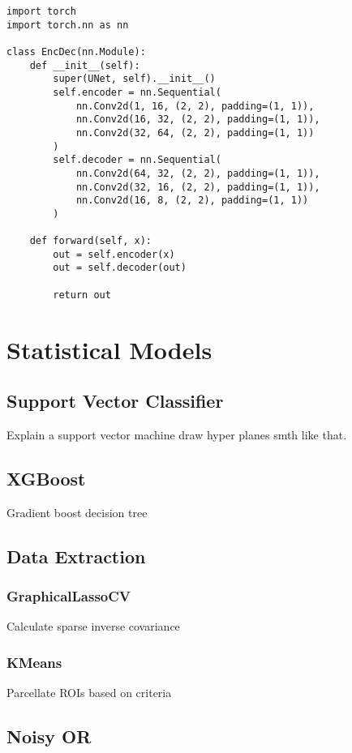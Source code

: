 \documentclass[11pt]{article}
\begin{document}
\begin{verbatim}
import torch
import torch.nn as nn

class EncDec(nn.Module):
    def __init__(self):
        super(UNet, self).__init__()
        self.encoder = nn.Sequential(
            nn.Conv2d(1, 16, (2, 2), padding=(1, 1)),
            nn.Conv2d(16, 32, (2, 2), padding=(1, 1)),
            nn.Conv2d(32, 64, (2, 2), padding=(1, 1))
        )
        self.decoder = nn.Sequential(
            nn.Conv2d(64, 32, (2, 2), padding=(1, 1)),
            nn.Conv2d(32, 16, (2, 2), padding=(1, 1)),
            nn.Conv2d(16, 8, (2, 2), padding=(1, 1))
        )

    def forward(self, x):
        out = self.encoder(x)
        out = self.decoder(out)

        return out
\end{verbatim}

\section{Statistical Models}
\label{sec:org257aa70}
\subsection{Support Vector Classifier}
\label{sec:org5348284}
Explain a support vector machine draw hyper planes smth like that.
\subsection{XGBoost}
\label{sec:orge09e07d}
Gradient boost decision tree
\subsection{Data Extraction}
\label{sec:orgce44384}
\subsubsection{GraphicalLassoCV}
\label{sec:orgb485094}
Calculate sparse inverse covariance
\subsubsection{KMeans}
\label{sec:org8dabafa}
Parcellate ROIs based on criteria
\subsection{Noisy OR}
\label{sec:orgcad6efa}
\end{document}

